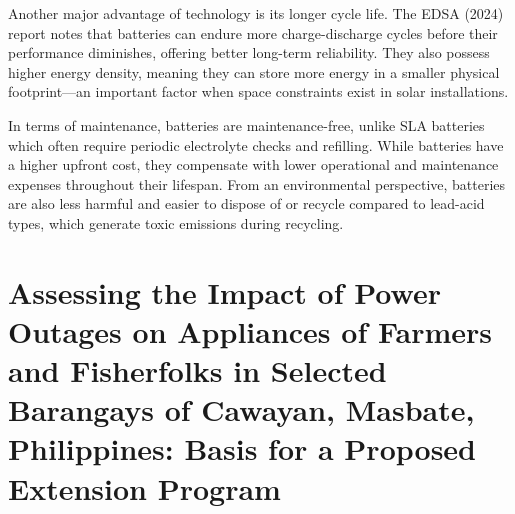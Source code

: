 {Another major advantage of  technology is its longer cycle life. The EDSA (2024) report notes that  batteries can endure more charge-discharge cycles before their performance diminishes, offering better long-term reliability. They also possess higher energy density, meaning they can store more energy in a smaller physical footprint—an important factor when space constraints exist in solar installations.

In terms of maintenance,  batteries are maintenance-free, unlike SLA batteries which often require periodic electrolyte checks and refilling. While  batteries have a higher upfront cost, they compensate with lower operational and maintenance expenses throughout their lifespan. From an environmental perspective,  batteries are also less harmful and easier to dispose of or recycle compared to lead-acid types, which generate toxic emissions during recycling.

\section{Assessing the Impact of Power Outages on Appliances of Farmers and Fisherfolks in Selected Barangays of Cawayan, Masbate, Philippines: Basis for a Proposed Extension Program}

}
